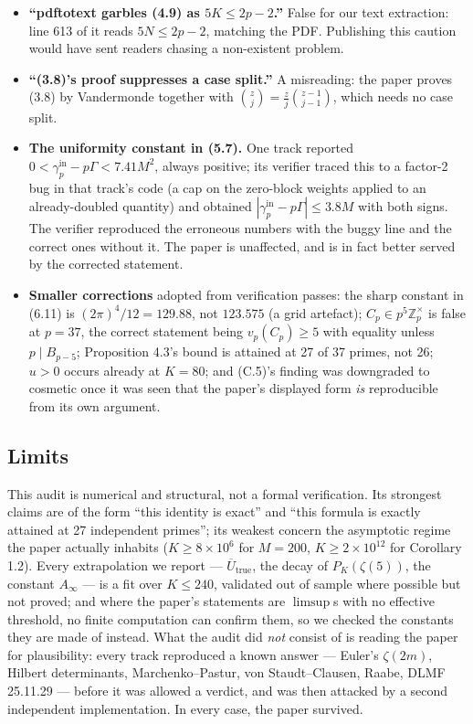 \documentclass[11pt]{article}
\theoremstyle{definition}
\newcommand{\z}{\zeta(5)}
\newcommand{\Ub}{\overline{U}}
\newcommand{\gin}{\gamma_p^{\mathrm{in}}}
\begin{document}
\begin{itemize}
proof, not hidden assumptions. (The genuine gap in that stretch is the separate
$b_a\le6\alpha x+3$, Finding~\ref{f:ba}.)
\item \textbf{``pdftotext garbles (4.9) as $5K\le2p-2$.''} False for our text extraction:
line 613 of it reads $5N\le2p-2$, matching the PDF. Publishing this caution would have sent
readers chasing a non-existent problem.
\item \textbf{``(3.8)'s proof suppresses a case split.''} A misreading: the paper proves (3.8) by
Vandermonde together with $\binom{z}{j}=\tfrac{z}{j}\binom{z-1}{j-1}$, which needs no case split.
\item \textbf{The uniformity constant in (5.7).} One track reported
$0<\gin-p\Gamma<7.41M^2$, always positive; its verifier traced this to a factor-2 bug in that
track's code (a cap on the zero-block weights applied to an already-doubled quantity) and
obtained $|\gin-p\Gamma|\le3.8M$ with both signs. The verifier reproduced the erroneous numbers
with the buggy line and the correct ones without it. The paper is unaffected, and is in fact
better served by the corrected statement.
\item \textbf{Smaller corrections} adopted from verification passes: the sharp constant in (6.11)
is $(2\pi)^4/12=129.88$, not $123.575$ (a grid artefact); $C_p\in p^5\mathbb{Z}_p^\times$ is false
at $p=37$, the correct statement being $v_p(C_p)\ge5$ with equality unless $p\mid B_{p-5}$;
Proposition 4.3's bound is attained at 27 of 37 primes, not 26; $u>0$ occurs already at $K=80$;
and (C.5)'s finding was downgraded to cosmetic once it was seen that the paper's displayed form
\emph{is} reproducible from its own argument.
\end{itemize}

\subsection{Limits}

This audit is numerical and structural, not a formal verification. Its strongest claims are of
the form ``this identity is exact'' and ``this formula is exactly attained at 27 independent
primes''; its weakest concern the asymptotic regime the paper actually inhabits
($K\ge8\times10^6$ for $M=200$, $K\ge2\times10^{12}$ for Corollary 1.2). Every extrapolation we
report --- $\Ub_{\mathrm{true}}$, the decay of $P_K(\z)$, the constant $A_\infty$ --- is a fit
over $K\le240$, validated out of sample where possible but not proved; and where the paper's
statements are $\limsup$s with no effective threshold, no finite computation can confirm them, so
we checked the constants they are made of instead. What the audit did \emph{not} consist of is
reading the paper for plausibility: every track reproduced a known answer --- Euler's
$\zeta(2m)$, Hilbert determinants, Marchenko--Pastur, von Staudt--Clausen, Raabe, DLMF 25.11.29
--- before it was allowed a verdict, and was then attacked by a second independent
implementation. In every case, the paper survived.
\end{document}
